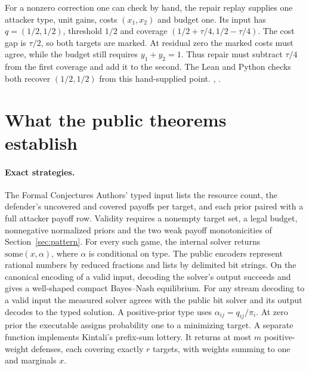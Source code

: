 \documentclass[11pt,letterpaper]{article}
\newcommand{\code}[1]{\textnormal{\texttt{\detokenize{#1}}}}
\newcommand{\baseurl}{https://github.com/robbiemu/bayesian-simple-security-games/blob/75bc25c2ddfac1813064434a3165b3ddd1a1f63d}
\newcommand{\decl}[3]{\href{\baseurl/lean/#1.lean\#L#2}{\code{#3}}}
\begin{document}
For a nonzero correction one can check by hand, the repair replay supplies
one attacker type, unit gains, costs $(x_1,x_2)$ and budget one. Its input
has $q=(1/2,1/2)$, threshold $1/2$ and coverage
$(1/2+\tau/4,1/2-\tau/4)$. The cost gap is $\tau/2$, so both targets
are marked. At residual zero the marked costs must agree, while the
budget still requires $y_1+y_2=1$. Thus repair must subtract $\tau/4$
from the first coverage and add it to the second. The Lean and Python
checks both recover $(1/2,1/2)$ from this hand-supplied point.
\decl{Replay/KintaliSearch}{21}{rounded},
\href{\baseurl/experiments/kintali_replay.py\#L192}{\code{check_nonzero_repair}}.

\section{What the public theorems establish}
\label{sec:public}

\paragraph{Exact strategies.}
The Formal Conjectures Authors' typed input lists the resource count, the defender's uncovered
and covered payoffs per target, and each prior paired with a full attacker
payoff row. Validity requires a nonempty target set, a legal budget,
nonnegative normalized priors and the two weak payoff monotonicities of
Section~\ref{sec:pattern}. For every such game, the internal solver returns
$\mathrm{some}(x,\alpha)$, where $\alpha$ is conditional on type. The public
encoders represent rational numbers by reduced fractions and lists by
delimited bit strings. On the canonical encoding of a valid input, decoding
the solver's output succeeds and gives a well-shaped compact Bayes--Nash
equilibrium. For any stream decoding to a valid input the measured solver
agrees with the public bit solver and its output decodes to the typed
solution. A positive-prior type uses $\alpha_{ij}=q_{ij}/\pi_i$.
At zero prior the executable assigns probability one to a minimizing target.
A separate function implements Kintali's prefix-sum lottery. It returns
at most $m$ positive-weight defenses, each covering exactly $r$ targets,
with weights summing to one and marginals $x$. \cite[\S1]{kintali}
\cite{artifact,upstream}
\end{document}
